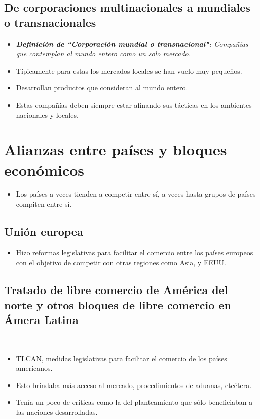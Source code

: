 \documentclass{article}
\begin{document}

\subsection{De corporaciones multinacionales a mundiales o transnacionales}
\begin{itemize}
    \item \emph{\textbf{Definición de ``Corporación mundial o transnacional":} Compañías que contemplan al mundo entero como un solo mercado.}
    \item Típicamente para estas los mercados locales se han vuelo muy pequeños.
    \item Desarrollan productos que consideran al mundo entero.
    \item Estas compañías deben siempre estar afinando sus tácticas en los ambientes nacionales y locales.
\end{itemize}

\section{Alianzas entre países y bloques económicos}
\begin{itemize}
    \item Los países a veces tienden a competir entre sí, a veces hasta grupos de países compiten entre sí.
\end{itemize}

\subsection{Unión europea}
\begin{itemize}
    \item Hizo reformas legislativas para facilitar el comercio entre los países europeos con el objetivo de competir con otras regiones como Asia, y EEUU.
\end{itemize}


\subsection{Tratado de libre comercio de América del norte y otros bloques de libre comercio en Ámera Latina}+
\begin{itemize}
    \item TLCAN, medidas legislativas para facilitar el comercio de los países americanos.
    \item Esto brindaba más acceso al mercado, procedimientos de aduanas, etcétera.
    \item Tenía un poco de críticas como la del planteamiento que sólo beneficiaban a las naciones desarrolladas.
\end{itemize}
\end{document}
